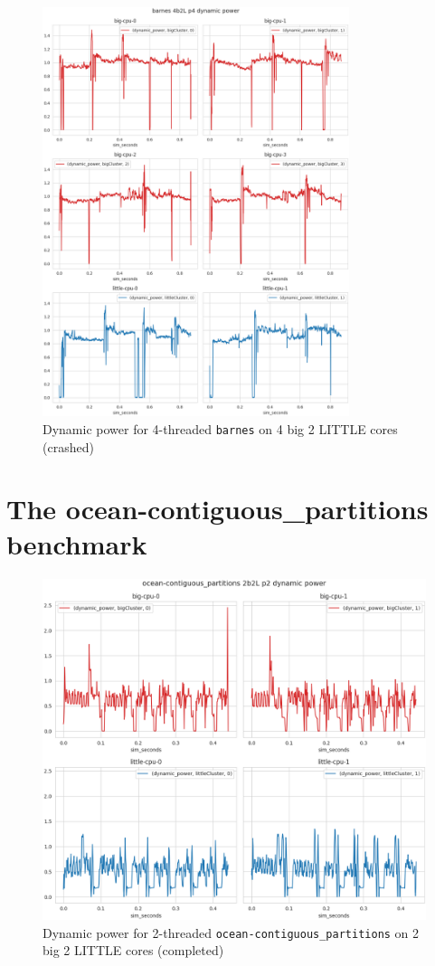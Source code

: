 \begin{figure}[H]
    \centering
    \includegraphics[width=0.8\textwidth]{roi-plots/barnes/4b2L/p4-fail-dyn-pow.png}
    \caption{Dynamic power for 4-threaded \texttt{barnes} on 4 big 2 LITTLE
             cores (crashed)}
\end{figure}


\section{The ocean-contiguous\_partitions benchmark}
\begin{figure}[H]
    \centering
    \includegraphics[height=0.6\textheight]{roi-plots/ocean-contiguous/2b2L/p2-success-dyn-pow.png}
    \caption{Dynamic power for 2-threaded \texttt{ocean-contiguous\_partitions}
             on 2 big 2 LITTLE cores (completed)}
\end{figure}

